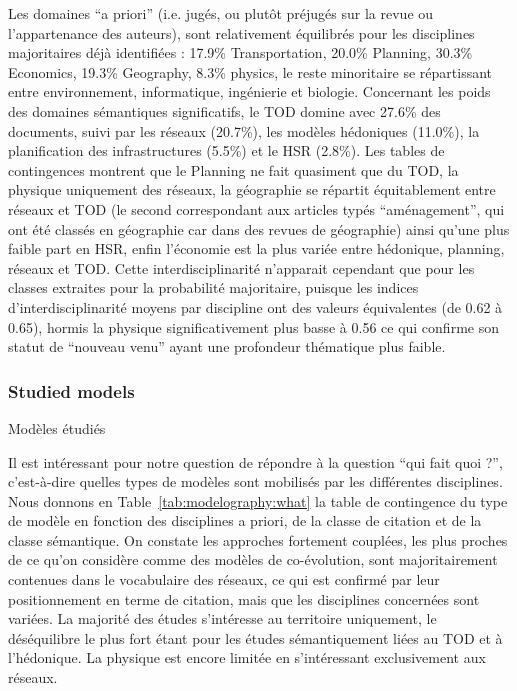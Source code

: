 Les domaines ``a priori'' (i.e. jugés, ou plutôt préjugés sur la revue ou l'appartenance des auteurs), sont relativement équilibrés pour les disciplines majoritaires déjà identifiées : 17.9\% Transportation, 20.0\% Planning, 30.3\% Economics, 19.3\% Geography, 8.3\% physics, le reste minoritaire se répartissant entre environnement, informatique, ingénierie et biologie. Concernant les poids des domaines sémantiques significatifs, le TOD domine avec 27.6\% des documents, suivi par les réseaux (20.7\%), les modèles hédoniques (11.0\%), la planification des infrastructures (5.5\%) et le HSR (2.8\%). Les tables de contingences montrent que le Planning ne fait quasiment que du TOD, la physique uniquement des réseaux, la géographie se répartit équitablement entre réseaux et TOD (le second correspondant aux articles typés ``aménagement'', qui ont été classés en géographie car dans des revues de géographie) ainsi qu'une plus faible part en HSR, enfin l'économie est la plus variée entre hédonique, planning, réseaux et TOD. Cette interdisciplinarité n'apparait cependant que pour les classes extraites pour la probabilité majoritaire, puisque les indices d'interdisciplinarité moyens par discipline ont des valeurs équivalentes (de 0.62 à 0.65), hormis la physique significativement plus basse à 0.56 ce qui confirme son statut de ``nouveau venu'' ayant une profondeur thématique plus faible.


\subsubsection{Studied models}{Modèles étudiés}

Il est intéressant pour notre question de répondre à la question ``qui fait quoi ?'', c'est-à-dire quelles types de modèles sont mobilisés par les différentes disciplines. Nous donnons en Table~\ref{tab:modelography:what} la table de contingence du type de modèle en fonction des disciplines a priori, de la classe de citation et de la classe sémantique. On constate les approches fortement couplées, les plus proches de ce qu'on considère comme des modèles de co-évolution, sont majoritairement contenues dans le vocabulaire des réseaux, ce qui est confirmé par leur positionnement en terme de citation, mais que les disciplines concernées sont variées. La majorité des études s'intéresse au territoire uniquement, le déséquilibre le plus fort étant pour les études sémantiquement liées au TOD et à l'hédonique. La physique est encore limitée en s'intéressant exclusivement aux réseaux. 


